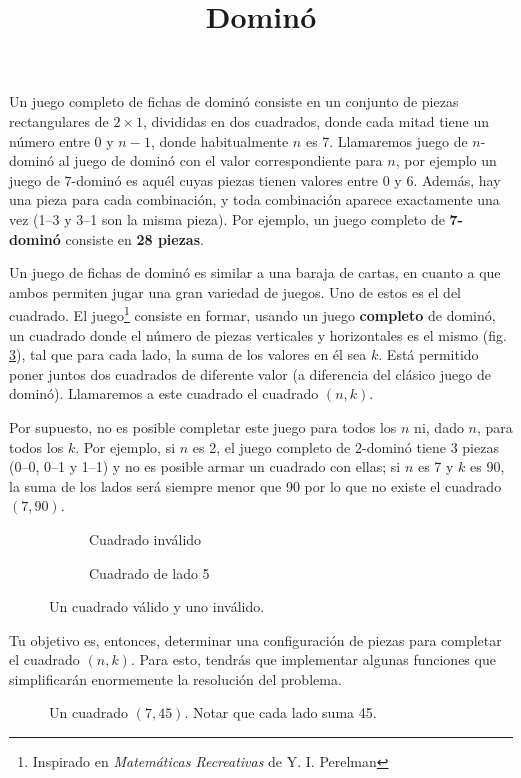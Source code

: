 \documentclass{oci}
\title{Dominó}
\begin{document}
\begin{problemDescription}
Un juego completo de fichas de dominó consiste en un conjunto de piezas rectangulares de $2\times1$, divididas en dos cuadrados, donde cada mitad tiene un número entre 0 y $n-1$, donde habitualmente $n$ es 7.
Llamaremos juego de $n$-dominó al juego de dominó con el valor correspondiente para $n$, por ejemplo un juego de $7$-dominó es aquél cuyas piezas tienen valores entre 0 y 6.
Además, hay una pieza para cada combinación, y toda combinación aparece exactamente una vez (1--3 y 3--1 son la misma pieza).
Por ejemplo, un juego completo de \textbf{7-dominó} consiste en \textbf{28 piezas}.

Un juego de fichas de dominó es similar a una baraja de cartas, en cuanto a que ambos permiten jugar una gran variedad de juegos.
Uno de estos es el del cuadrado.
El juego\footnote{Inspirado en \emph{Matemáticas Recreativas} de Y. I. Perelman} consiste en formar, usando un juego \textbf{completo} de dominó, un cuadrado donde el número de piezas verticales y horizontales es el mismo (fig. \ref{f:cuadrados}), tal que para cada lado, la suma de los valores en él sea $k$.
Está permitido poner juntos dos cuadrados de diferente valor (a diferencia del clásico juego de dominó).
Llamaremos a este cuadrado el cuadrado $(n,k)$.

Por supuesto, no es posible completar este juego para todos los $n$ ni, dado $n$, para todos los $k$.
Por ejemplo, si $n$ es 2, el juego completo de $2$-dominó tiene 3 piezas (0--0, 0--1 y 1--1) y no es posible armar un cuadrado con ellas; si $n$ es 7 y $k$ es 90, la suma de los lados será siempre menor que 90 por lo que no existe el cuadrado $(7,90)$.

\begin{figure}[!h]
 \centering
 \begin{subfigure}[b]{0.45\textwidth}
  \centering
  
  \caption{Cuadrado inválido}
  \label{f:invalido}
 \end{subfigure}
 \begin{subfigure}[b]{0.45\textwidth}
  \centering
  
  \caption{Cuadrado de lado 5}
  \label{f:valido}
 \end{subfigure}
 \caption{Un cuadrado válido y uno inválido.}
 \label{f:cuadrados}
\end{figure}

Tu objetivo es, entonces, determinar una configuración de piezas para completar el cuadrado $(n,k)$.
Para esto, tendrás que implementar algunas funciones que simplificarán enormemente la resolución del problema.

\begin{figure}[ht]
 \centering
 
 \caption{Un cuadrado $(7,45)$. Notar que cada lado suma 45.}
 \label{f:cuadrado7}
\end{figure}

\end{problemDescription}
\end{document}
